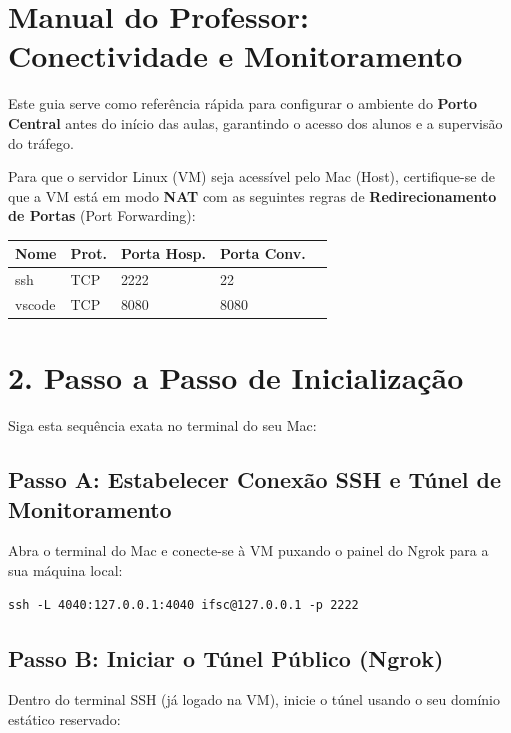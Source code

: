 \documentclass[12pt,a4paper]{article}
\begin{document}
\section*{Manual do Professor: Conectividade e Monitoramento}

Este guia serve como referência rápida para configurar o ambiente do \textbf{Porto Central} antes do início das aulas, garantindo o acesso dos alunos e a supervisão do tráfego.

\begin{boxAtividade}
Para que o servidor Linux (VM) seja acessível pelo Mac (Host), certifique-se de que a VM está em modo \textbf{NAT} com as seguintes regras de \textbf{Redirecionamento de Portas} (Port Forwarding):

\vspace{0.3cm}
\centering
\begin{tabular}{|l|l|l|l|l|}
\hline
\rowcolor{azulTitulo!20} \textbf{Nome} & \textbf{Prot.} & \textbf{Porta Hosp.} & \textbf{Porta Conv.} \\ \hline
ssh & TCP & 2222 & 22 \\ \hline
vscode & TCP & 8080 & 8080 \\ \hline
\end{tabular}
\end{boxAtividade}

\section*{2. Passo a Passo de Inicialização}

Siga esta sequência exata no terminal do seu Mac:

\subsection*{Passo A: Estabelecer Conexão SSH e Túnel de Monitoramento}
Abra o terminal do Mac e conecte-se à VM puxando o painel do Ngrok para a sua máquina local:

\begin{boxCodigo}
\begin{verbatim}
ssh -L 4040:127.0.0.1:4040 ifsc@127.0.0.1 -p 2222
\end{verbatim}
\end{boxCodigo}

\subsection*{Passo B: Iniciar o Túnel Público (Ngrok)}
Dentro do terminal SSH (já logado na VM), inicie o túnel usando o seu domínio estático reservado:
\end{document}
